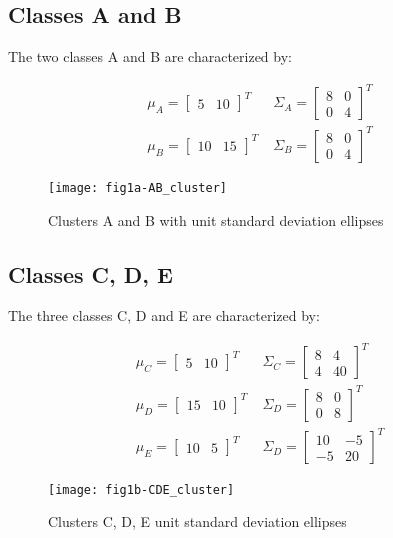  \subsection{Classes A and B}
 The two classes A and B are characterized by:

\begin{eqnarray}
{\mu}_{A}=\left[ \begin{smallmatrix} 5&10 \end{smallmatrix}\right]^{T} \; & {\Sigma}_{A}=\left[ \begin{smallmatrix} 8&0 \\ 0&4 \end{smallmatrix}\right]^{T} \nonumber\\
{\mu}_{B}=\left[ \begin{smallmatrix} 10&15 \end{smallmatrix}\right]^{T} \; & {\Sigma}_{B}=\left[ \begin{smallmatrix} 8&0 \\ 0&4 \end{smallmatrix}\right]^{T} \nonumber
\end{eqnarray}

\begin{figure}[ht]
\centering
	\texttt{[image: fig1a-AB\_cluster]}
	\label{fig:clustersDataAB}
	\caption{Clusters A and B with unit standard deviation ellipses}
\end{figure}

 \subsection{Classes C, D, E}
 The three classes C, D and E are characterized by:
 
 \begin{eqnarray}
{\mu}_{C}=\left[ \begin{smallmatrix} 5&10 \end{smallmatrix}\right]^{T} \; & {\Sigma}_{C}=\left[ \begin{smallmatrix} 8&4 \\ 4&40 \end{smallmatrix}\right]^{T} \nonumber\\
{\mu}_{D}=\left[ \begin{smallmatrix} 15&10 \end{smallmatrix}\right]^{T} \; & {\Sigma}_{D}=\left[ \begin{smallmatrix} 8&0 \\ 0&8 \end{smallmatrix}\right]^{T} \nonumber\\
{\mu}_{E}=\left[ \begin{smallmatrix} 10&5 \end{smallmatrix}\right]^{T} \; & {\Sigma}_{D}=\left[ \begin{smallmatrix} 10&-5 \\ -5&20 \end{smallmatrix}\right]^{T} \nonumber
\end{eqnarray}
 
 
\begin{figure}[ht]
\centering
	\texttt{[image: fig1b-CDE\_cluster]}
	\label{fig:clustersDataCDE}
	\caption{Clusters C, D, E unit standard deviation ellipses}
\end{figure}
 
\clearpage
